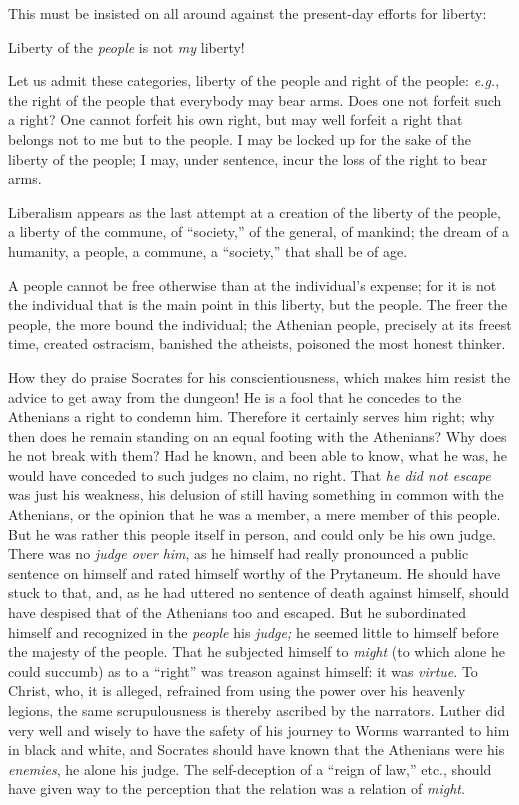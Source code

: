 \documentclass[12pt,a4paper]{book}
\begin{document}
This must be insisted on all around against the present-day efforts for 
liberty:

Liberty of the \textit{people} is not \textit{my} liberty!

Let us admit these categories, liberty of the people and right of the people: 
\textit{e.g.}, the right of the people that everybody may bear arms. Does one 
not forfeit such a right? One cannot forfeit his own right, but may well 
forfeit a right that belongs not to me but to the people. I may be locked up 
for the sake of the liberty of the people; I may, under sentence, incur the 
loss of the right to bear arms.

Liberalism appears as the last attempt at a creation of the liberty of the 
people, a liberty of the commune, of ``society,'' of the general, of 
mankind; the dream of a humanity, a people, a commune, a ``society,'' that 
shall be of age.

A people cannot be free otherwise than at the individual's expense; for it is 
not the individual that is the main point in this liberty, but the people. The 
freer the people, the more bound the individual; the Athenian people, 
precisely at its freest time, created ostracism, banished the atheists, 
poisoned the most honest thinker.

How they do praise Socrates for his conscientiousness, which makes him resist 
the advice to get away from the dungeon! He is a fool that he concedes to the 
Athenians a right to condemn him. Therefore it certainly serves him right; why 
then does he remain standing on an equal footing with the Athenians? Why does 
he not break with them? Had he known, and been able to know, what he was, he 
would have conceded to such judges no claim, no right. That \textit{he did not 
escape} was just his weakness, his delusion of still having something in 
common with the Athenians, or the opinion that he was a member, a mere member 
of this people. But he was rather this people itself in person, and could only 
be his own judge. There was no \textit{judge over him}, as he himself had 
really pronounced a public sentence on himself and rated himself worthy of the 
Prytaneum. He should have stuck to that, and, as he had uttered no sentence of 
death against himself, should have despised that of the Athenians too and 
escaped. But he subordinated himself and recognized in the \textit{people} his 
\textit{judge;} he seemed little to himself before the majesty of the people. 
That he subjected himself to \textit{might} (to which alone he could succumb) 
as to a ``right'' was treason against himself: it was \textit{virtue}. To 
Christ, who, it is alleged, refrained from using the power over his heavenly 
legions, the same scrupulousness is thereby ascribed by the narrators. Luther 
did very well and wisely to have the safety of his journey to Worms warranted 
to him in black and white, and Socrates should have known that the Athenians 
were his \textit{enemies}, he alone his judge. The self-deception of a 
``reign of law,'' etc., should have given way to the perception that the 
relation was a relation of \textit{might}.
\end{document}
